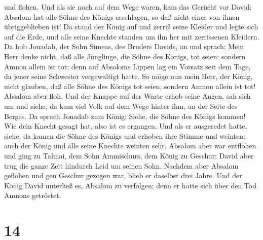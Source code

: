 und flohen.  Und als sie noch auf dem Wege waren, kam das
Gerücht vor David: Absalom hat alle Söhne des Königs erschlagen, so daß
nicht einer von ihnen übriggeblieben ist!  Da stand der
König auf und zerriß seine Kleider und legte sich auf die Erde, und alle
seine Knechte standen um ihn her mit zerrissenen Kleidern.
 Da hob Jonadab, der Sohn Simeas, des Bruders Davids, an
und sprach: Mein Herr denke nicht, daß alle Jünglinge, die Söhne des
Königs, tot seien; sondern Amnon allein ist tot; denn auf Absaloms
Lippen lag ein Vorsatz seit dem Tage, da jener seine Schwester
vergewaltigt hatte.  So möge nun mein Herr, der König,
nicht glauben, daß alle Söhne des Königs tot seien, sondern Amnon allein
ist tot!  Absalom aber floh. Und der Knappe auf der Warte
erhob seine Augen, sah sich um und siehe, da kam viel Volk auf dem Wege
hinter ihm, an der Seite des Berges.  Da sprach Jonadab
zum König: Siehe, die Söhne des Königs kommen! Wie dein Knecht gesagt
hat, also ist es ergangen.  Und als er ausgeredet hatte,
siehe, da kamen die Söhne des Königs und erhoben ihre Stimme und
weinten; auch der König und alle seine Knechte weinten sehr.
 Absalom aber war entflohen und ging zu Talmai, dem Sohn
Ammischurs, dem König zu Geschur; David aber trug die ganze Zeit
hindurch Leid um seinen Sohn.  Nachdem aber Absalom
geflohen und gen Geschur gezogen war, blieb er daselbst drei Jahre.
 Und der König David unterließ es, Absalom zu verfolgen;
denn er hatte sich über den Tod Amnons getröstet.

\hypertarget{section-13}{%
\section{14}\label{section-13}}

